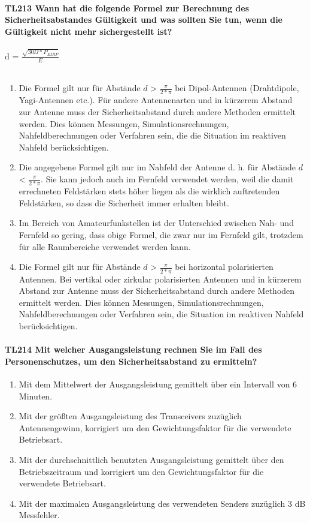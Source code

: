 \documentclass[8pt]{article}
\begin{document}
\paragraph*{TL213 Wann hat die folgende Formel zur Berechnung des Sicherheitsabstandes Gültigkeit und was sollten Sie tun, wenn die Gültigkeit nicht mehr sichergestellt ist?}
d = $\frac{\sqrt{30\Omega * P_{EIRP}}}{E}$\\\\
\begin{enumerate}[nolistsep,label=\Alph*]
\item Die Formel gilt nur für Abstände $d$ > $\frac{\pi}{2 * \pi}$ bei Dipol-Antennen (Drahtdipole, Yagi-Antennen etc.). Für andere Antennenarten und in kürzerem Abstand zur Antenne muss der Sicherheitsabstand durch andere Methoden ermittelt werden. Dies können Messungen, Simulationsrechnungen, Nahfeldberechnungen oder Verfahren sein, die die Situation im reaktiven Nahfeld berücksichtigen.
\item Die angegebene Formel gilt nur im Nahfeld der Antenne d. h. für Abstände $d$ < $\frac{\pi}{2 * \pi}$. Sie kann jedoch auch im Fernfeld verwendet werden, weil die damit errechneten Feldstärken stets höher liegen als die wirklich auftretenden Feldstärken, so dass die Sicherheit immer erhalten bleibt.
\item Im Bereich von Amateurfunkstellen ist der Unterschied zwischen Nah- und Fernfeld so gering, dass obige Formel, die zwar nur im Fernfeld gilt, trotzdem für alle Raumbereiche verwendet werden kann.
\item Die Formel gilt nur für Abstände $d$ > $\frac{\pi}{2 * \pi}$ bei horizontal polarisierten Antennen. Bei vertikal oder zirkular polarisierten Antennen und in kürzerem Abstand zur Antenne muss der Sicherheitsabstand durch andere Methoden ermittelt werden. Dies können Messungen, Simulationsrechnungen, Nahfeldberechnungen oder Verfahren sein, die Situation im reaktiven Nahfeld berücksichtigen.
\end{enumerate}

\paragraph*{TL214 Mit welcher Ausgangsleistung rechnen Sie im Fall des Personenschutzes, um den Sicherheitsabstand zu ermitteln?} 
\begin{enumerate}[nolistsep,label=\Alph*]
\item Mit dem Mittelwert der Ausgangsleistung gemittelt über ein Intervall von 6 Minuten. 
\item Mit der größten Ausgangsleistung des Transceivers zuzüglich Antennengewinn, korrigiert um den Gewichtungsfaktor für die verwendete Betriebsart.
\item Mit der durchschnittlich benutzten Ausgangsleistung gemittelt über den Betriebszeitraum und korrigiert um den Gewichtungsfaktor für die verwendete Betriebsart.
\item Mit der maximalen Ausgangsleistung des verwendeten Senders zuzüglich 3 dB Messfehler. 
\end{enumerate}
\end{document}
